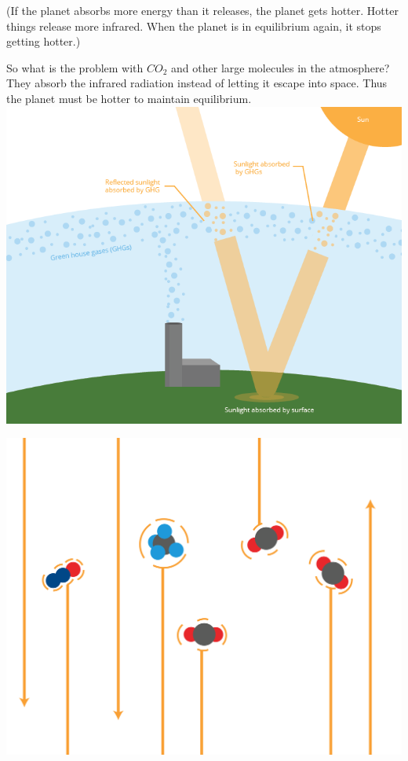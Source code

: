 (If the planet absorbs more energy than it releases, the planet gets
hotter.  Hotter things release more infrared. When the planet is in
equilibrium again, it stops getting hotter.)

So what is the problem with $CO_2$ and other large molecules in the
atmosphere? They absorb the infrared radiation instead of letting it
escape into space. Thus the planet must be hotter to maintain
equilibrium.
\includegraphics[width=1\textwidth]{ghgEffect.png}

\includegraphics[width=1\textwidth]{ghgClose.png}

